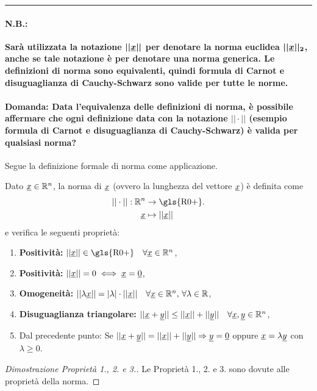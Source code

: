 \hrule

\paragraph{N.B.:} \textbf{Sarà utilizzata la notazione $\boldsymbol{||\uline x||}$ per denotare la norma euclidea $\boldsymbol{||\uline x||_2}$, anche se tale notazione è per denotare una norma generica. Le definizioni di norma sono equivalenti, quindi formula di Carnot e disuguaglianza di Cauchy-Schwarz sono valide per tutte le norme.}

\paragraph{Domanda: Data l'equivalenza delle definizioni di norma, è possibile affermare che ogni definizione data con la notazione $||\cdot||$ (esempio formula di Carnot e disuguaglianza di Cauchy-Schwarz) è valida per qualsiasi norma?}

Segue la definizione formale di norma come applicazione.

\begin{definition}[Norma]\label{def:norma}
	Dato $\uline x\in\mathbb R^n$, la norma di $\uline x$ (ovvero la lunghezza del vettore $\uline x$) è definita come
	\begin{equation}
		\begin{aligned}[t]
			||\cdot||:\mathbb R^n &\rightarrow\text{\gls{R0+}}.\\
			\uline x &\mapsto ||\uline x||
		\end{aligned}
	\end{equation}
	e verifica le seguenti proprietà:
	\begin{enumerate}
		\item \textbf{Positività:} $||\uline x||\in\text{\gls{R0+}}\quad \forall\uline x\in\mathbb R^n$,
		\item \textbf{Positività:} $||\uline x||=0\iff\uline x=\uline 0$,
		\item \textbf{Omogeneità:} $||\lambda \uline x||=|\lambda|\cdot||\uline x||\quad\forall\uline x\in\mathbb R^n,\,\forall\lambda\in\mathbb R$,
		\item \textbf{Disuguaglianza triangolare:} $||\uline x+\uline y||\leq ||\uline x||+||\uline y||\quad \forall\uline x,\uline y\in\mathbb R^n$,
		\item Dal precedente punto: Se $||\uline x+\uline y||=||\uline x||+||\uline y||\Rightarrow\uline y=\uline 0$ oppure $\uline x=\lambda\uline y$ con $\lambda\geq 0$.
	\end{enumerate}
\end{definition}
\begin{proof}[Dimostrazione Proprietà 1., 2. e 3.]
	Le Proprietà 1., 2. e 3. sono dovute alle proprietà della norma.
\end{proof}

